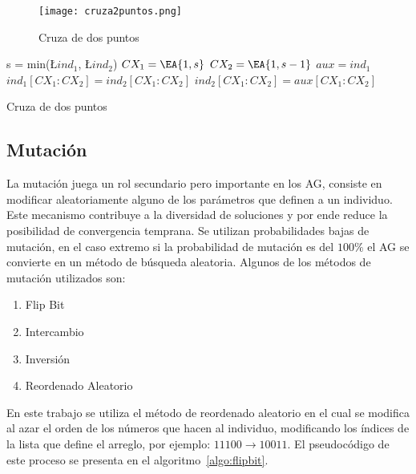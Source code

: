 \begin{figure}[h!]
  \centering
  \texttt{[image: cruza2puntos.png]}
  \caption{Cruza de dos puntos~\parencite{wirsansky}}\label{fig:cr2puntos}
\end{figure}


\begin{algorithm}[h!]
  \BlankLine
  s = min(\L{$ind_{1}$}, \L {$ind_{2}$})\;
  $CX_{1} = \EA{1, s}$\;
  $CX_{2} = \EA{1, s-1}$\;
  $aux = ind_{1}$\;
  $ind_{1}[CX_{1}:CX_{2}] = ind_{2}[CX_{1}:CX_{2}]$\;
  $ind_{2}[CX_{1}:CX_{2}] = aux[CX_{1}:CX_{2}]$\;
  \;
  \caption{Cruza de dos puntos}\label{algo:cr2puntos}
\end{algorithm}

\subsection{Mutación}
%
La mutación juega un rol secundario pero importante en los AG, consiste en
modificar aleatoriamente alguno de los parámetros que definen a un individuo.
%
Este mecanismo contribuye a la diversidad de soluciones y por ende reduce la posibilidad de
convergencia temprana.
%
Se utilizan probabilidades bajas de mutación, en el caso extremo si la
probabilidad de mutación es del $100\%$ el AG se convierte en un método de
búsqueda aleatoria.
%
Algunos de los métodos de mutación utilizados son:

\begin{enumerate}
  \item Flip Bit
  \item Intercambio
  \item Inversión
  \item Reordenado Aleatorio
\end{enumerate}

En este trabajo se utiliza el método de reordenado aleatorio en el cual se
modifica al azar el orden de los números que hacen al individuo, modificando los
índices de la lista que define el arreglo, por ejemplo: $11100 \rightarrow 10011$.
%
El pseudocódigo de este proceso se presenta en el algoritmo~\ref{algo:flipbit}.


